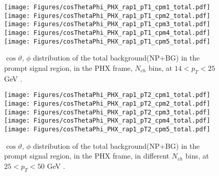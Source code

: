\documentclass[12pt]{article}
\newcommand{\pt}{$p_{\mathrm{T}}$}
\begin{document}
\begin{figure}[htbp]
\centering
\texttt{[image: Figures/cosThetaPhi\_PHX\_rap1\_pT1\_cpm1\_total.pdf]}
\texttt{[image: Figures/cosThetaPhi\_PHX\_rap1\_pT1\_cpm2\_total.pdf]}
\texttt{[image: Figures/cosThetaPhi\_PHX\_rap1\_pT1\_cpm3\_total.pdf]}
\texttt{[image: Figures/cosThetaPhi\_PHX\_rap1\_pT1\_cpm4\_total.pdf]}
\texttt{[image: Figures/cosThetaPhi\_PHX\_rap1\_pT1\_cpm5\_total.pdf]}
\caption{$\cos\vartheta,\,\phi$ distribution of the total background(NP+BG) in the prompt signal region, 
	in the PHX frame, $N_{ch}$ bins, at $14 < p_{T} < 25$ GeV .}
\end{figure}
\clearpage

\begin{figure}[htbp]
\centering
\texttt{[image: Figures/cosThetaPhi\_PHX\_rap1\_pT2\_cpm1\_total.pdf]}
\texttt{[image: Figures/cosThetaPhi\_PHX\_rap1\_pT2\_cpm2\_total.pdf]}
\texttt{[image: Figures/cosThetaPhi\_PHX\_rap1\_pT2\_cpm3\_total.pdf]}
\texttt{[image: Figures/cosThetaPhi\_PHX\_rap1\_pT2\_cpm4\_total.pdf]}
\texttt{[image: Figures/cosThetaPhi\_PHX\_rap1\_pT2\_cpm5\_total.pdf]}
\caption{$\cos\vartheta,\,\phi$ distribution of the total background(NP+BG) in the prompt signal region, 
	in the PHX frame, in different $N_{ch}$ bins, at $25 < p_{T} < 50$ GeV .}
\end{figure}
\clearpage

\end{document}
